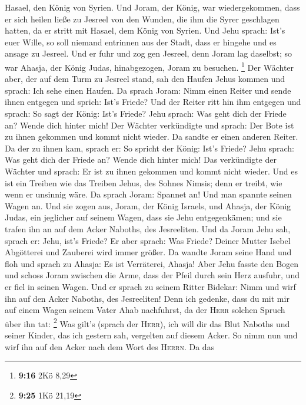 Hasael, den König von Syrien.  Und Joram, der König, war
wiedergekommen, dass er sich heilen ließe zu Jesreel von den Wunden, die
ihm die Syrer geschlagen hatten, da er stritt mit Hasael, dem König von
Syrien. Und Jehu sprach: Ist's euer Wille, so soll niemand entrinnen aus
der Stadt, dass er hingehe und es ansage zu Jesreel.  Und
er fuhr und zog gen Jesreel, denn Joram lag daselbst; so war Ahasja, der
König Judas, hinabgezogen, Joram zu besuchen. \footnote{\textbf{9:16}
  2Kö 8,29}  Der Wächter aber, der auf dem Turm zu
Jesreel stand, sah den Haufen Jehus kommen und sprach: Ich sehe einen
Haufen. Da sprach Joram: Nimm einen Reiter und sende ihnen entgegen und
sprich: Ist's Friede?  Und der Reiter ritt hin ihm
entgegen und sprach: So sagt der König: Ist's Friede? Jehu sprach: Was
geht dich der Friede an? Wende dich hinter mich! Der Wächter verkündigte
und sprach: Der Bote ist zu ihnen gekommen und kommt nicht wieder.
 Da sandte er einen anderen Reiter. Da der zu ihnen kam,
sprach er: So spricht der König: Ist's Friede? Jehu sprach: Was geht
dich der Friede an? Wende dich hinter mich!  Das
verkündigte der Wächter und sprach: Er ist zu ihnen gekommen und kommt
nicht wieder. Und es ist ein Treiben wie das Treiben Jehus, des Sohnes
Nimsis; denn er treibt, wie wenn er unsinnig wäre.  Da
sprach Joram: Spannet an! Und man spannte seinen Wagen an. Und sie zogen
aus, Joram, der König Israels, und Ahasja, der König Judas, ein
jeglicher auf seinem Wagen, dass sie Jehu entgegenkämen; und sie trafen
ihn an auf dem Acker Naboths, des Jesreeliten.  Und da
Joram Jehu sah, sprach er: Jehu, ist's Friede? Er aber sprach: Was
Friede? Deiner Mutter Isebel Abgötterei und Zauberei wird immer größer.
 Da wandte Joram seine Hand und floh und sprach zu
Ahasja: Es ist Verräterei, Ahasja!  Aber Jehu fasste den
Bogen und schoss Joram zwischen die Arme, dass der Pfeil durch sein Herz
ausfuhr, und er fiel in seinen Wagen.  Und er sprach zu
seinem Ritter Bidekar: Nimm und wirf ihn auf den Acker Naboths, des
Jesreeliten! Denn ich gedenke, dass du mit mir auf einem Wagen seinem
Vater Ahab nachfuhrst, da der \textsc{Herr} solchen Spruch über ihn tat:
\footnote{\textbf{9:25} 1Kö 21,19}  Was gilt's (sprach
der \textsc{Herr}), ich will dir das Blut Naboths und seiner Kinder, das
ich gestern sah, vergelten auf diesem Acker. So nimm nun und wirf ihn
auf den Acker nach dem Wort des \textsc{Herrn}.  Da das

